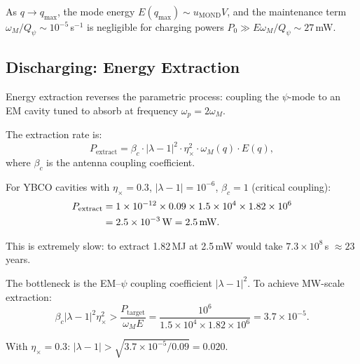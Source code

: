 \documentclass[11pt]{article}
\theoremstyle{definition}
\theoremstyle{remark}
\newcommand{\Qpsi}{Q_\psi}
\begin{document}
As $q \to q_{\max}$, the mode energy $E(q_{\max}) \sim u_{\mathrm{MOND}} V$,
and the maintenance term $\omega_M / \Qpsi \sim 10^{-5}$\,s$^{-1}$
is negligible for charging powers $P_0 \gg E \omega_M / \Qpsi \sim 27$\,mW.

\subsection{Discharging: Energy Extraction}

Energy extraction reverses the parametric process: coupling the
$\psi$-mode to an EM cavity tuned to absorb at frequency $\omega_p = 2\omega_M$.

The extraction rate is:
\begin{equation}
P_{\mathrm{extract}} = \beta_c \cdot |\lambda - 1|^2 \cdot \eta_\times^2
\cdot \omega_M(q) \cdot E(q),
\end{equation}
where $\beta_c$ is the antenna coupling coefficient.

For YBCO cavities with $\eta_\times = 0.3$, $|\lambda - 1| = 10^{-6}$,
$\beta_c = 1$ (critical coupling):
\begin{align}
P_{\mathrm{extract}} &= 1 \times 10^{-12} \times 0.09
\times 1.5 \times 10^4 \times 1.82 \times 10^6 \notag \\
&= 2.5 \times 10^{-3}\,\mathrm{W} = 2.5\,\mathrm{mW}.
\end{align}

This is extremely slow: to extract 1.82\,MJ at 2.5\,mW would take
$7.3 \times 10^8$\,s $\approx 23$\,years.

The bottleneck is the EM--$\psi$ coupling coefficient $|\lambda - 1|^2$.
To achieve MW-scale extraction:
\begin{equation}
\beta_c |\lambda - 1|^2 \eta_\times^2 > \frac{P_{\mathrm{target}}}
{\omega_M E} = \frac{10^6}{1.5 \times 10^4 \times 1.82 \times 10^6}
= 3.7 \times 10^{-5}.
\end{equation}

With $\eta_\times = 0.3$: $|\lambda - 1| > \sqrt{3.7 \times 10^{-5}/0.09}
= 0.020$.
\end{document}

